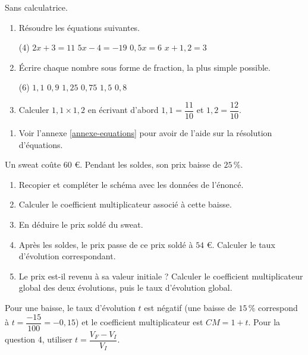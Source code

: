 \documentclass[10pt,a4paper]{article}
\begin{document}
\begin{bloc}
\begin{exo}
Sans calculatrice.
\begin{enumerate}[leftmargin=*]
    \item Résoudre les équations suivantes.
    \begin{tasks}(4)
        \task \(2x+3=11\)
        \task \(5x-4=-19\)
        \task \(0,5x=6\)
        \task \(x+1,2=3\)
    \end{tasks}
    \item Écrire chaque nombre sous forme de fraction, la plus simple possible.
    \begin{tasks}(6)
        \task \(1,1\)
        \task \(0,9\)
        \task \(1,25\)
        \task \(0,75\)
        \task \(1,5\)
        \task \(0,8\)
    \end{tasks}
    \item Calculer \(1,1\times 1,2\) en écrivant d'abord \(1,1=\dfrac{11}{10}\) et \(1,2=\dfrac{12}{10}\).
\end{enumerate}
\end{exo}

\begin{indication}
    \begin{enumerate}
        \item Voir l'annexe \ref{annexe-equations} pour avoir de l'aide sur la résolution d'équations.
    \end{enumerate}
\end{indication}
\end{bloc}

\begin{bloc}
\begin{exo}[Guidé]
Un sweat coûte \(60\) \euro. Pendant les soldes, son prix baisse de \(25\,\%\).
\begin{enumerate}[leftmargin=*]
    \item Recopier et compléter le schéma avec les données de l'énoncé.
    \schemaevolution{\dots}{\dots}{\dots}{\times \dots}
    \item Calculer le coefficient multiplicateur associé à cette baisse.
    \item En déduire le prix soldé du sweat.
    \item Après les soldes, le prix passe de ce prix soldé à \(54\) \euro. Calculer le taux d'évolution correspondant.
    \item Le prix est-il revenu à sa valeur initiale ? Calculer le coefficient multiplicateur global des deux évolutions, puis le taux d'évolution global.
\end{enumerate}

\begin{indication}
Pour une baisse, le taux d'évolution \(t\) est négatif (une baisse de \(15\,\%\) correspond à \(t=\dfrac{-15}{100}=-0,15\)) et le coefficient multiplicateur est \(CM=1+t\). Pour la question 4, utiliser \(t=\dfrac{V_F-V_I}{V_I}\).
\end{indication}

\end{exo}
\end{bloc}
\end{document}
